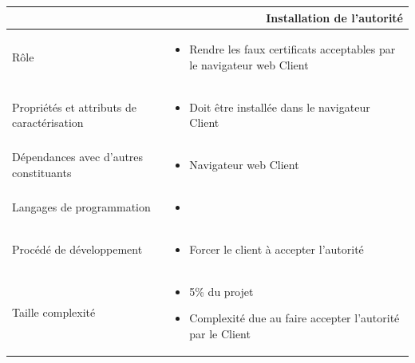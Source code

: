 \documentclass[a4paper,11pt,french]{article}
\begin{document}
\begin{center}
        \vspace*{0.7cm}
        \begin{tabularx}{16cm}{|l|X|}
        \hline
        \multicolumn{2}{|r|}{\textbf{Installation de l'autorité}}\\
        \hline
        R\^ole &  \begin{itemize}\item Rendre les faux certificats acceptables par le navigateur web Client\end{itemize}\\
        \hline
        Propriétés et attributs de caractérisation & \begin{itemize} \item Doit \^etre installée dans le navigateur Client \end{itemize}\\
        \hline
        Dépendances avec d'autres constituants & \begin{itemize}\item Navigateur web Client\end{itemize}\\
        \hline
        Langages de programmation & \begin{itemize} \item  \end{itemize}\\
        \hline
        Procédé de développement & \begin{itemize}\item Forcer le client à accepter l'autorité\end{itemize}\\
        \hline
        Taille complexité & \begin{itemize}\item 5\% du projet \item Complexité due au faire accepter l'autorité par le Client \end{itemize}\\
        \hline
        \end{tabularx}
\end{center}

\end{document}
